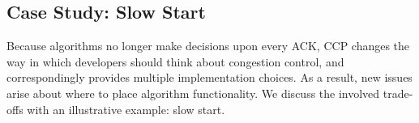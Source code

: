 %
%
%

\subsection{Case Study: Slow Start}
\label{s:ccp:semantics}

Because algorithms no longer make decisions upon every ACK, CCP changes the way in which developers should think about congestion control, and correspondingly provides multiple implementation choices. As a result, new issues arise about where to place algorithm functionality. We discuss the involved trade-offs with an illustrative example: slow start.

